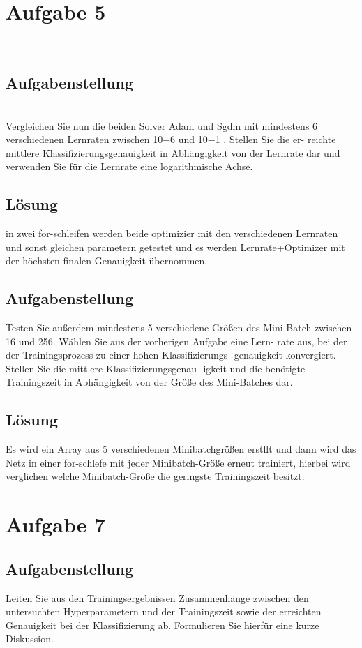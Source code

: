 \documentclass[8pt,a4paper]{article}
\begin{document}
\section{Aufgabe 5}
\\
\subsection{Aufgabenstellung}
\\
Vergleichen Sie nun die beiden Solver Adam und Sgdm mit mindestens 6
verschiedenen Lernraten zwischen 10−6 und 10−1 . Stellen Sie die er-
reichte mittlere Klassifizierungsgenauigkeit in Abhängigkeit von der
Lernrate dar und verwenden Sie für die Lernrate eine logarithmische
Achse.
\\
\subsection{Lösung}
in zwei for-schleifen werden beide optimizier mit den verschiedenen Lernraten und sonst gleichen parametern getestet und es werden Lernrate+Optimizer mit der höchsten finalen Genauigkeit übernommen.



\subsection{Aufgabenstellung}
Testen Sie außerdem mindestens 5 verschiedene Größen des Mini-Batch
zwischen 16 und 256. Wählen Sie aus der vorherigen Aufgabe eine Lern-
rate aus, bei der der Trainingsprozess zu einer hohen Klassifizierungs-
genauigkeit konvergiert. Stellen Sie die mittlere Klassifizierungsgenau-
igkeit und die benötigte Trainingszeit in Abhängigkeit von der Größe
des Mini-Batches dar.
\\

\subsection{Lösung}
Es wird ein Array aus 5 verschiedenen Minibatchgrößen erstllt und dann wird das Netz in einer for-schlefe mit jeder Minibatch-Größe erneut trainiert, hierbei wird verglichen welche Minibatch-Größe die geringste Trainingszeit besitzt.



\section{Aufgabe 7}
\subsection{Aufgabenstellung}
Leiten Sie aus den Trainingsergebnissen Zusammenhänge zwischen den
untersuchten Hyperparametern und der Trainingszeit sowie der erreichten Genauigkeit bei der Klassifizierung ab. Formulieren Sie hierfür eine
kurze Diskussion.
\end{document}
